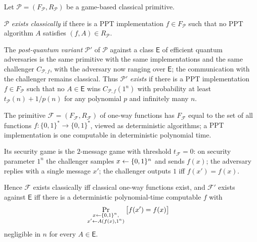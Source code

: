 \documentclass{aicr-conjecture}
\newcommand{\bits}{\{0,1\}}
\newcommand{\Pc}{\mathcal{P}}
\newcommand{\Fc}{\mathcal{F}}
\newcommand{\Es}{\mathsf{E}}
\newcommand{\PPT}{\mathrm{PPT}}
\begin{document}
\begin{definition}\label{def:exist}
Let $\Pc = (F_{\Pc}, R_{\Pc})$ be a game-based classical primitive.

$\Pc$ \emph{exists classically} if there is a $\PPT$ implementation
$f \in F_{\Pc}$ such that no $\PPT$ algorithm $A$ satisfies
$(f,A) \in R_{\Pc}$.

The \emph{post-quantum variant} $\Pc'$ of $\Pc$ against a class $\Es$ of
efficient quantum adversaries is the same primitive with the same
implementations and the same challenger $C_{\Pc,f}$, with the adversary
now ranging over $\Es$; the communication with the challenger remains
classical. Thus $\Pc'$ \emph{exists} if there is a $\PPT$ implementation
$f \in F_{\Pc}$ such that no $A \in \Es$ wins $C_{\Pc,f}(1^n)$ with
probability at least $t_{\Pc}(n) + 1/p(n)$ for any polynomial $p$ and
infinitely many $n$.
\end{definition}

\begin{definition}\label{def:owf}
The primitive $\Fc = (F_{\Fc}, R_{\Fc})$ of one-way functions has
$F_{\Fc}$ equal to the set of all functions
$f : \bits^* \to \bits^*$, viewed as deterministic algorithms; a $\PPT$
implementation is one computable in deterministic polynomial time.

Its security game is the $2$-message game with threshold $t_{\Fc} = 0$:
on security parameter $1^n$ the challenger samples $x \sample \bits^n$
and sends $f(x)$; the adversary replies with a single message $x'$; the
challenger outputs $1$ iff $f(x') = f(x)$.

Hence $\Fc$ exists classically iff classical one-way functions exist,
and $\Fc'$ exists against $\Es$ iff there is a deterministic
polynomial-time computable $f$ with
\[
  \Pr_{\substack{x \sample \bits^n,\\ x' \sample A(f(x),1^n)}}
  \big[f(x') = f(x)\big]
\]
negligible in $n$ for every $A \in \Es$.
\end{definition}
\end{document}
